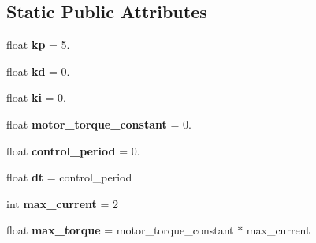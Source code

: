 \subsection*{Static Public Attributes}
\begin{DoxyCompactItemize}
\item 
\mbox{\label{classrobot__properties__bolt_1_1config_1_1BoltAbstract_acbf1c22583ad952bcc44da2a2ecd6a37}} 
float {\bfseries kp} = 5.
\item 
\mbox{\label{classrobot__properties__bolt_1_1config_1_1BoltAbstract_a0e28f7c221b04a4c1e1c17c70e36082a}} 
float {\bfseries kd} = 0.
\item 
\mbox{\label{classrobot__properties__bolt_1_1config_1_1BoltAbstract_aca4343ff9e5859dd648ce7a6d72ac9a2}} 
float {\bfseries ki} = 0.
\item 
\mbox{\label{classrobot__properties__bolt_1_1config_1_1BoltAbstract_a4a989772e9a927e7e7bcaf8d0fc56eff}} 
float {\bfseries motor\+\_\+torque\+\_\+constant} = 0.
\item 
\mbox{\label{classrobot__properties__bolt_1_1config_1_1BoltAbstract_a458bd418b9c7445a52c8949143aac53a}} 
float {\bfseries control\+\_\+period} = 0.
\item 
\mbox{\label{classrobot__properties__bolt_1_1config_1_1BoltAbstract_a7e4b05c34dff03c57b8993e3ba607b7d}} 
float {\bfseries dt} = control\+\_\+period
\item 
\mbox{\label{classrobot__properties__bolt_1_1config_1_1BoltAbstract_affa85a628826e3f7cddeff5341f2c92e}} 
int {\bfseries max\+\_\+current} = 2
\item 
\mbox{\label{classrobot__properties__bolt_1_1config_1_1BoltAbstract_aef2224102582b76575515484857ba15b}} 
float {\bfseries max\+\_\+torque} = motor\+\_\+torque\+\_\+constant $\ast$ max\+\_\+current

\end{DoxyCompactItemize}
